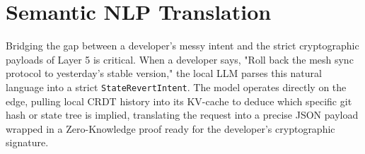 \section{Semantic NLP Translation}
Bridging the gap between a developer's messy intent and the strict cryptographic payloads of Layer 5 is critical. When a developer says, "Roll back the mesh sync protocol to yesterday's stable version," the local LLM parses this natural language into a strict \texttt{StateRevertIntent}. The model operates directly on the edge, pulling local CRDT history into its KV-cache to deduce which specific git hash or state tree is implied, translating the request into a precise JSON payload wrapped in a Zero-Knowledge proof ready for the developer's cryptographic signature.
